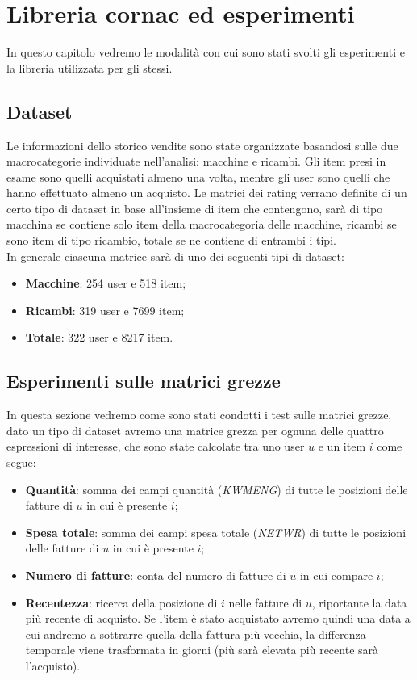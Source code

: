 \hypertarget{(chap:capitolo5)}{}
\chapter{Libreria cornac ed esperimenti}
In questo capitolo vedremo le modalità con cui sono stati svolti gli esperimenti e la libreria utilizzata per gli stessi.

\section{Dataset}
Le informazioni dello storico vendite sono state organizzate basandosi sulle due macrocategorie individuate nell'analisi: macchine e ricambi.
Gli item presi in esame sono quelli acquistati almeno una volta, mentre gli user sono quelli che hanno effettuato almeno un acquisto.
Le matrici dei rating verrano definite di un certo tipo di dataset in base all'insieme di item che contengono, sarà di tipo macchina se contiene solo item della macrocategoria delle macchine, ricambi se sono item di tipo ricambio, totale se ne contiene di entrambi i tipi.\\
In generale ciascuna matrice sarà di uno dei seguenti tipi di dataset:

\begin{itemize}
    \item \textbf{Macchine}: 254 user e 518 item;
    \item \textbf{Ricambi}: 319 user e 7699 item;
    \item \textbf{Totale}: 322 user e 8217 item.
\end{itemize}

\section{Esperimenti sulle matrici grezze}
In questa sezione vedremo come sono stati condotti i test sulle matrici grezze, dato un tipo di dataset avremo una matrice grezza per ognuna delle quattro espressioni di interesse, che sono state calcolate tra uno user $u$ e un item $i$ come segue:
\begin{itemize}
    \item \textbf{Quantità}: somma dei campi quantità (\textit{KWMENG}) di tutte le posizioni delle fatture di $u$ in cui è presente $i$;
    \item \textbf{Spesa totale}: somma dei campi spesa totale (\textit{NETWR}) di tutte le posizioni delle fatture di $u$ in cui è presente $i$;
    \item \textbf{Numero di fatture}: conta del numero di fatture di $u$ in cui compare $i$;
    \item \textbf{Recentezza}: ricerca della posizione di $i$ nelle fatture di $u$, riportante la data più recente di acquisto. Se l'item è stato acquistato avremo quindi una data a cui andremo a sottrarre quella della fattura più vecchia, la differenza temporale viene trasformata in giorni (più sarà elevata più recente sarà l'acquisto).
\end{itemize}


